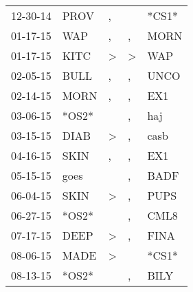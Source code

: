 \begin{supertabular}{p{0.07\textwidth}p{0.06\textwidth}p{0.02\textwidth}p{0.02\textwidth}p{0.06\textwidth}}
          12-30-14\textsuperscript{} &           PROV\textsuperscript{} &                , &                  &                            *CS1* \\
          01-17-15\textsuperscript{} &            WAP\textsuperscript{} &                , &                , &           MORN\textsuperscript{} \\
          01-17-15\textsuperscript{} &           KITC\textsuperscript{} &     \textgreater &     \textgreater &            WAP\textsuperscript{} \\
          02-05-15\textsuperscript{} &           BULL\textsuperscript{} &                , &                , &           UNCO\textsuperscript{} \\
          02-14-15\textsuperscript{} &           MORN\textsuperscript{} &                , &                , &            EX1\textsuperscript{} \\
          03-06-15\textsuperscript{} &                            *OS2* &                  &                , &            haj\textsuperscript{} \\
          03-15-15\textsuperscript{} &           DIAB\textsuperscript{} &     \textgreater &                , &           casb\textsuperscript{} \\
          04-16-15\textsuperscript{} &           SKIN\textsuperscript{} &                , &                , &            EX1\textsuperscript{} \\
          05-15-15\textsuperscript{} &           goes\textsuperscript{} &                  &                , &           BADF\textsuperscript{} \\
          06-04-15\textsuperscript{} &           SKIN\textsuperscript{} &     \textgreater &                , &           PUPS\textsuperscript{} \\
          06-27-15\textsuperscript{} &                            *OS2* &                  &                , &           CML8\textsuperscript{} \\
          07-17-15\textsuperscript{} &           DEEP\textsuperscript{} &     \textgreater &                , &           FINA\textsuperscript{} \\
          08-06-15\textsuperscript{} &           MADE\textsuperscript{} &     \textgreater &                  &                            *CS1* \\
          08-13-15\textsuperscript{} &                            *OS2* &                  &                , &           BILY\textsuperscript{} \\

\end{supertabular}
